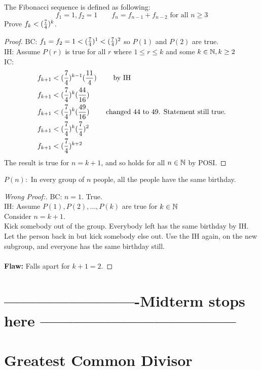 \documentclass[english, 12pt]{article}
\begin{document}
\begin{exmp}
The Fibonacci sequence is defined as following:
\[f_{1} = 1, f_{2} = 1\qquad f_{n}=f_{n-1}+ f_{n-2} \text{ for all } n \geq 3\]
Prove $f_{k} < (\frac{7}{4})^k$.
\begin{proof}
BC: $f_{1} = f_{2} = 1 < (\frac{7}{4})^1 < (\frac{7}{4})^2$ so $P(1)$ and $P(2)$ are true.\\
IH: Assume $P(r)$ is true for all $r$ where $1 \leq r \leq k$ and some $k \in {\mathbb{N}}, k \geq 2$\\
IC:
\begin{align*}
 & f_{k+1} < (\frac{7}{4})^{k-1} (\frac{11}{4}) \qquad \text{ by IH}\\
 & f_{k+1} < (\frac{7}{4})^k (\frac{44}{16}) \\
 & f_{k+1} < (\frac{7}{4})^k (\frac{49}{16}) \qquad \text{ changed $44$ to $49$.  Statement still true.}\\
 & f_{k+1} < (\frac{7}{4})^k(\frac{7}{4})^2 \\
 & f_{k+1} < (\frac{7}{4})^{k+2} 
\end{align*}
The result is true for $n = k+1$, and so holds for all $n\in{\mathbb{N}}$ by POSI.
\end{proof}
\end{exmp}

\begin{exmp}
$P(n): $ In every group of $n$ people, all the people have the same birthday. 
\begin{proof}[Wrong Proof:]
BC: $n=1$. True. \\
IH: Assume $P(1), P(2),\dots, P(k)$ are true for $k \in {\mathbb{N}}$\\
Consider $n=k+1$. \\
Kick somebody out of the group. Everybody left has the same birthday by IH. Let the person back in but kick somebody else out. Use the IH again, on the new subgroup, and everyone has the same birthday still. \\\\ 
\textbf{Flaw:} Falls apart for $k+1=2$.
\end{proof}
\end{exmp}
\section*{-------------------------Midterm stops here ------------------------------------}
\section{Greatest Common Divisor}
\end{document}
